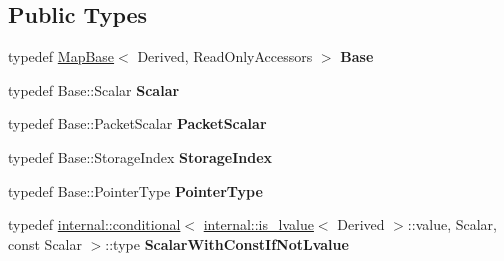 \subsection*{Public Types}
\begin{DoxyCompactItemize}
\item 
\mbox{\label{class_eigen_1_1_map_base_3_01_derived_00_01_write_accessors_01_4_a4f52766f5ba30aba67e8768c13aa6d24}} 
typedef \mbox{\hyperlink{class_eigen_1_1_map_base}{Map\+Base}}$<$ Derived, Read\+Only\+Accessors $>$ {\bfseries Base}
\item 
\mbox{\label{class_eigen_1_1_map_base_3_01_derived_00_01_write_accessors_01_4_ac76e1c5cbac21882c60626c02775fa0a}} 
typedef Base\+::\+Scalar {\bfseries Scalar}
\item 
\mbox{\label{class_eigen_1_1_map_base_3_01_derived_00_01_write_accessors_01_4_a18d59d76ec7b5b0dd3eb81b5f8a98497}} 
typedef Base\+::\+Packet\+Scalar {\bfseries Packet\+Scalar}
\item 
\mbox{\label{class_eigen_1_1_map_base_3_01_derived_00_01_write_accessors_01_4_a58118130780691f37741e8deb726472a}} 
typedef Base\+::\+Storage\+Index {\bfseries Storage\+Index}
\item 
\mbox{\label{class_eigen_1_1_map_base_3_01_derived_00_01_write_accessors_01_4_a8da8a981ab5c8612edae694d182e1a0d}} 
typedef Base\+::\+Pointer\+Type {\bfseries Pointer\+Type}
\item 
\mbox{\label{class_eigen_1_1_map_base_3_01_derived_00_01_write_accessors_01_4_a85fa506ce575c6d08d5abb70f70bf8a3}} 
typedef \mbox{\hyperlink{struct_eigen_1_1internal_1_1conditional}{internal\+::conditional}}$<$ \mbox{\hyperlink{struct_eigen_1_1internal_1_1is__lvalue}{internal\+::is\+\_\+lvalue}}$<$ Derived $>$\+::value, Scalar, const Scalar $>$\+::type {\bfseries Scalar\+With\+Const\+If\+Not\+Lvalue}
\end{DoxyCompactItemize}
